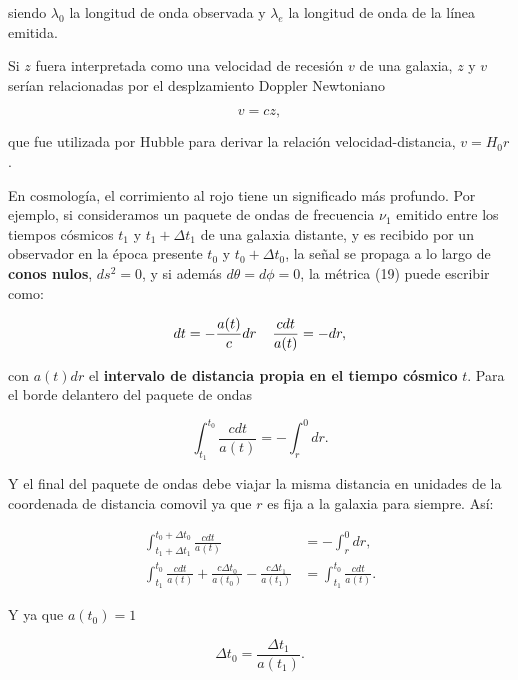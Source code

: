 \documentclass[11pt]{article}
\begin{document}
siendo $\lambda_0$ la longitud de onda observada y $\lambda_e$ la longitud de onda de la línea emitida.  



Si $z$ fuera interpretada como una velocidad de recesión $v$ de una galaxia, $z$ y $v$ serían relacionadas por el desplzamiento Doppler Newtoniano

    \begin{equation}
        v= cz,
    \end{equation}

que fue utilizada por Hubble para derivar la relación velocidad-distancia, $v=H_0 r$. 

En cosmología, el corrimiento al rojo tiene un significado más profundo. Por ejemplo, si consideramos un paquete de ondas de frecuencia $\nu_1$ emitido entre los tiempos cósmicos $t_1$ y $t_1 +  \Delta t_1$ de una galaxia distante, y es recibido por un observador en la época presente $t_0$ y $t_0 + \Delta t_0$, la señal se propaga a lo largo de {\bf{conos nulos}}, $ds^2=0$, y si además $d\theta = d\phi = 0$, la métrica (19) puede escribir como:

    \begin{equation}
        dt = - \frac{a(t)}{c} dr \hspace{0.4cm} \frac{c dt}{a(t)} = -dr,
    \end{equation} 

con $a(t) dr$ el {\bf{intervalo de distancia propia en el tiempo cósmico}} $t$. Para el borde delantero del paquete de ondas 

    \begin{equation}
        \int_{t_1}^{t_0} \frac{cdt}{a(t)} = - \int_r^0{dr}.
    \end{equation}
        
Y el final del paquete de ondas debe viajar la misma distancia en unidades de la coordenada de distancia comovil ya que $r$ es fija a la galaxia para siempre. Así:

    \begin{align} 
        \int_{t_1 + \Delta t_1}^{t_0 + \Delta t_0}{ \frac{cdt}{a(t)}} & = - \int_r^0{dr}, \\
        \int_{t_1}^{t_0}{ \frac{cdt}{a(t)} +  \frac{c \Delta t_0}{a(t_0)} -\frac{c \Delta t_1}{a(t_1) }}   & =  \int_{t_1}^{t_0}{ \frac{cdt}{a(t)}}. 
     \end{align}

 Y ya que $a(t_0) = 1$

    \begin{equation}
        \Delta t_0 = \frac{\Delta t_1}{a(t_1)}.
    \end{equation}
\end{document}
